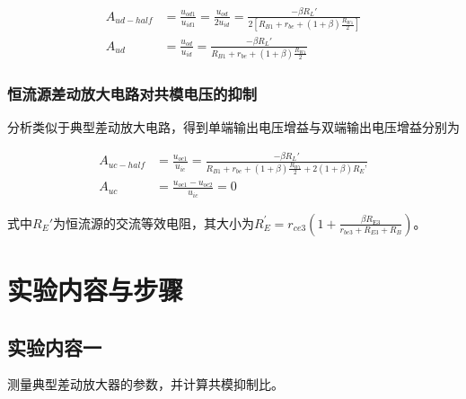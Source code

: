 \documentclass[a4paper,11pt,UTF8]{ctexart}
\begin{document}
	
	
	\begin{equation}
		\begin{aligned}
			A_{ud-half}&=\frac{u_{od1}}{u_{id1}}=\frac{u_{od}}{2u_{id}}=\frac{-\beta R_L'}{2[R_{B1}+r_{be}+(1+\beta)\frac{R_{W1}}{2}]}\\
			A_{ud}&=\frac{u_{od}}{u_{id}}=\frac{-\beta R_L'}{R_{B1}+r_{be}+(1+\beta)\frac{R_{W1}}{2}}
		\end{aligned}
	\end{equation}
	
	
	\subsubsection{恒流源差动放大电路对共模电压的抑制}
	分析类似于典型差动放大电路，得到单端输出电压增益与双端输出电压增益分别为
	
	\begin{equation}
		\begin{aligned}
			A_{uc-half}&=\frac{u_{oc1}}{u_{ic}}=\frac{-\beta R_L'}{R_{B1}+r_{be}+(1+\beta)\frac{R_{W1}}{2}+2(1+\beta)R_E’}\\
			A_{uc}&=\frac{u_{oc1}-u_{oc2}}{u_{ic}}=0
		\end{aligned}
	\end{equation}
	
	式中$R_E'$为恒流源的交流等效电阻，其大小为$R_{E}^{\prime}=r_{c e 3}\left(1+\frac{\beta R_{\mathrm{E} 3}}{r_{b e 3}+R_{E 3}+R_{B}}\right)$。
	
	\section{实验内容与步骤}
	\subsection{实验内容一}
	测量典型差动放大器的参数，并计算共模抑制比。
\end{document}

